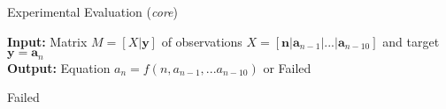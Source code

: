 \documentclass[t,usenames,dvipsnames]{beamer} %
\newcommand{\1}{\boldsymbol{1}}
\newcommand{\0}{\boldsymbol{0}}
\begin{document}
\begin{frame}{Experimental Evaluation (\textit{core})}
     
    \begin{algorithm}[H]
        \caption{For experimental evaluation of Diofantos for \textit{core} case
        }
    \raggedright
        \textbf{Input:} Matrix  $M = [X|\textbf{y}]$ of observations 
         $X = [\textbf{n}|\textbf{a}_{n-1}|...|\textbf{a}_{n-10}]$ 
         and target $\textbf{y} = \textbf{a}_n$
        \\
        \textbf{Output:} Equation $a_n = f(n, a_{n-1}, ... a_{n-10})$ or Failed
    \begin{algorithmic}[1]
        \EndIf
        \EndFor
    \EndFor
    \State \Return Failed
    \EndFunction
    \end{algorithmic}
    \end{algorithm}
 \end{frame}
\end{document}
